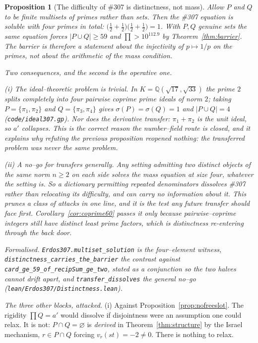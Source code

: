 \documentclass[11pt]{article}
\newtheorem{proposition}[theorem]{Proposition}
\theoremstyle{definition}
\begin{document}
\begin{proposition}[The difficulty of \#307 is distinctness, not mass]\label{prop:distinct}
Allow $P$ and $Q$ to be finite \emph{multisets} of primes rather than sets. Then the \#307 equation
is soluble with four primes in total:
$\bigl(\tfrac12+\tfrac12\bigr)\bigl(\tfrac12+\tfrac12\bigr)=1$. With $P,Q$ genuine sets the same
equation forces $|P\cup Q|\ge59$ and $\prod>10^{112.9}$ by Theorem~\ref{thm:barrier}. The barrier is
therefore a statement about the injectivity of $p\mapsto1/p$ on the primes, not about the arithmetic
of the mass condition.

Two consequences, and the second is the operative one.

\textup{(i)} \emph{The ideal--theoretic problem is trivial.} In $K=\mathbb{Q}(\sqrt{17},\sqrt{33})$
the prime $2$ splits completely into four pairwise coprime prime ideals of norm $2$; taking
$P=\{\pi_1,\pi_2\}$ and $Q=\{\pi_3,\pi_4\}$ gives $\sigma(P)=\sigma(Q)=1$ and $|P\cup Q|=4$
\textup{(\texttt{code/ideal307.gp})}. Nor does the derivative transfer: $\pi_1+\pi_2$ is the unit
ideal, so $a'$ collapses. This is the correct reason the number--field route is closed, and it
explains why refuting the previous proposition reopened nothing: the transferred problem was never
the same problem.

\textup{(ii)} \emph{A no--go for transfers generally.} Any setting admitting two distinct objects of
the same norm $n\ge2$ on each side solves the mass equation at size four, whatever the setting is.
So a dictionary permitting repeated denominators \emph{dissolves} \#307 rather than relocating its
difficulty, and can carry no information about it. This prunes a class of attacks in one line, and
it is the test any future transfer should face first. Corollary~\ref{cor:coprime60} passes it only
because pairwise--coprime integers still have distinct least prime factors, which is distinctness
re-entering through the back door.

\textup{Formalised.} \texttt{Erdos307.multiset\_solution} is the four--element witness,
\texttt{distinctness\_carries\_the\_barrier} the contrast against
\texttt{card\_ge\_59\_of\_recipSum\_ge\_two}, stated as a conjunction so the two halves cannot drift
apart, and \texttt{transfer\_dissolves} the general no--go
\textup{(\texttt{lean/Erdos307/Distinctness.lean})}.
\end{proposition}

\emph{The three other blocks, attacked.} \textup{(i) Against Proposition~\ref{prop:nofreeslot}.} The rigidity $\prod Q=a'$ would dissolve if
disjointness were an assumption one could relax. It is not: $P\cap Q=\varnothing$ is
\emph{derived} in Theorem~\ref{thm:structure} by the Israel mechanism, $r\in P\cap Q$ forcing
$v_r(st)=-2\neq0$. There is nothing to relax.
\end{document}
